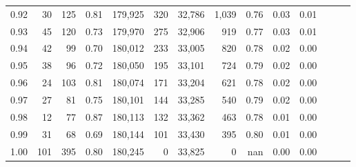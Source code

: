 \begin{tabular}{rrrrrrrrrrrrrr}
0.92 &     30 &  125 &  0.81 &  179,925 &      320 &  32,786 &   1,039 &  0.76 &  0.03 &      0.01 \\
0.93 &     45 &  120 &  0.73 &  179,970 &      275 &  32,906 &     919 &  0.77 &  0.03 &      0.01 \\
0.94 &     42 &   99 &  0.70 &  180,012 &      233 &  33,005 &     820 &  0.78 &  0.02 &      0.00 \\
0.95 &     38 &   96 &  0.72 &  180,050 &      195 &  33,101 &     724 &  0.79 &  0.02 &      0.00 \\
0.96 &     24 &  103 &  0.81 &  180,074 &      171 &  33,204 &     621 &  0.78 &  0.02 &      0.00 \\
0.97 &     27 &   81 &  0.75 &  180,101 &      144 &  33,285 &     540 &  0.79 &  0.02 &      0.00 \\
0.98 &     12 &   77 &  0.87 &  180,113 &      132 &  33,362 &     463 &  0.78 &  0.01 &      0.00 \\
0.99 &     31 &   68 &  0.69 &  180,144 &      101 &  33,430 &     395 &  0.80 &  0.01 &      0.00 \\
1.00 &    101 &  395 &  0.80 &  180,245 &        0 &  33,825 &       0 &   nan &  0.00 &      0.00 \\
\bottomrule
\end{tabular}

